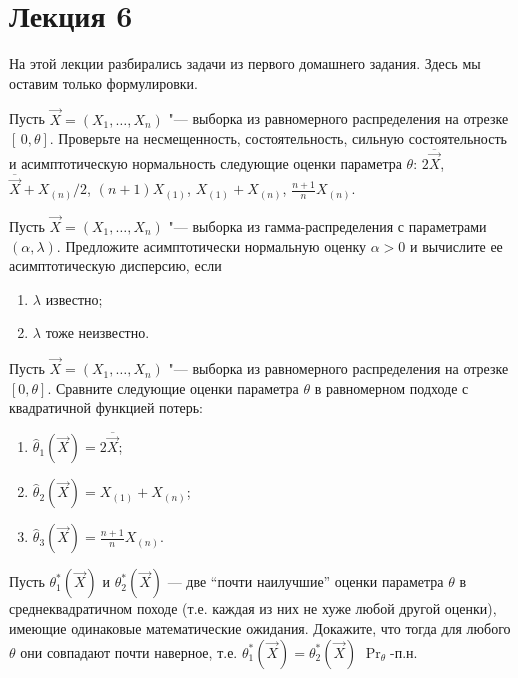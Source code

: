 
\section{Лекция 6}
На этой лекции разбирались задачи из первого домашнего задания. Здесь мы оставим только формулировки.
\begin{problem}
    Пусть $\vec{X} = (X_{1}, \ldots, X_{n})$ "--- выборка из равномерного распределения на отрезке $[\,0, \theta]$. Проверьте на несмещенность, состоятельность, сильную состоятельность и асимптотическую нормальность следующие оценки параметра $\theta$: $2\overline{\vec{X}}$, $\overline{\vec{X}} + X_{(n)}/2$, $(n + 1)X_{(1)}$, $X_{(1)} + X_{(n)}$, $\frac{n + 1}{n}X_{(n)}$.
\end{problem}

\begin{problem}
    Пусть $\vec{X} = (X_{1}, \ldots, X_{n})$ "--- выборка из гамма-распределения с параметрами $(\alpha, \lambda)$. Предложите асимптотически нормальную оценку $\alpha > 0$ и вычислите ее асимптотическую дисперсию, если 
    \begin{enumerate}[label=(\alph*)]
        \item $\lambda$ известно;
        \item $\lambda$ тоже неизвестно.
    \end{enumerate}
\end{problem}

\begin{problem}
    Пусть $\vec{X} = (X_{1}, \ldots, X_{n})$ "--- выборка из равномерного распределения на отрезке $[0, \theta]$. Сравните следующие оценки параметра $\theta$ в равномерном подходе с квадратичной функцией потерь:
    \begin{enumerate}
        \item $\hat{\theta}_{1}(\vec{X}) = 2\overline{\vec{X}}$;
        \item $\hat{\theta}_{2}(\vec{X}) = X_{(1)} + X_{(n)}$;
        \item $\hat{\theta}_{3}(\vec{X}) = \frac{n + 1}{n}X_{(n)}$.
    \end{enumerate}
\end{problem}

\begin{problem}
    Пусть $\theta^{*}_{1}(\vec{X})$ и $\theta^{*}_{2}(\vec{X})$ — две ``почти наилучшие'' оценки параметра $\theta$ в среднеквадратичном походе (т.е. каждая из них не хуже любой другой оценки), имеющие одинаковые математические ожидания. Докажите, что тогда для любого $\theta$ они совпадают почти наверное, т.е. $\theta^{*}_{1}(\vec{X}) = \theta^{*}_{2}(\vec{X})$ $\Pr_{\theta}$-п.н.
\end{problem}

